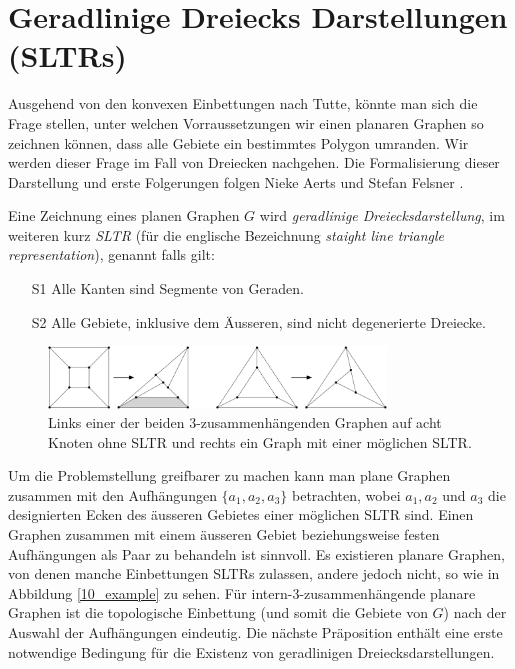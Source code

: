 \section{Geradlinige Dreiecks Darstellungen (SLTRs)}

Ausgehend von den konvexen Einbettungen nach Tutte, könnte man sich die Frage stellen, unter welchen Vorraussetzungen wir einen planaren Graphen so zeichnen können, dass alle Gebiete ein bestimmtes Polygon umranden. Wir werden dieser Frage im Fall von Dreiecken nachgehen. Die Formalisierung dieser Darstellung und erste Folgerungen folgen Nieke Aerts und Stefan Felsner \cite{af13,af15}.

\begin{definition}[SLTR]\label{defsltr}
Eine Zeichnung eines planen Graphen $G$ wird \textit{geradlinige Dreiecksdarstellung}, im weiteren kurz \textit{SLTR} (für die englische Bezeichnung \textit{staight line triangle representation}), genannt falls gilt:
\begin{itemize}
\item[S1] Alle Kanten sind Segmente von Geraden.
\item[S2] Alle Gebiete, inklusive dem Äusseren, sind nicht degenerierte Dreiecke.
\end{itemize}
\end{definition}

\begin{figure}[h]
	\centering
  \includegraphics[width=0.8\textwidth]{sltr-example.png}
	\caption{Links einer der beiden 3-zusammenhängenden Graphen auf acht Knoten ohne SLTR und rechts ein Graph mit einer möglichen SLTR.}
\end{figure}

Um die Problemstellung greifbarer zu machen kann man plane Graphen zusammen mit den Aufhängungen $\{a_1,a_2,a_3\}$ betrachten, wobei $a_1,a_2$ und $a_3$ die designierten Ecken des äusseren Gebietes einer möglichen SLTR sind. Einen Graphen zusammen mit einem äusseren Gebiet beziehungsweise festen Aufhängungen als Paar zu behandeln ist sinnvoll. Es existieren planare Graphen, von denen manche Einbettungen SLTRs zulassen, andere jedoch nicht, so wie in Abbildung \ref{10_example} zu sehen. Für intern-3-zusammenhängende planare Graphen ist die topologische Einbettung (und somit die Gebiete von $G$) nach der Auswahl der Aufhängungen eindeutig. Die nächste Präposition enthält eine erste notwendige Bedingung für die Existenz von geradlinigen Dreiecksdarstellungen.

